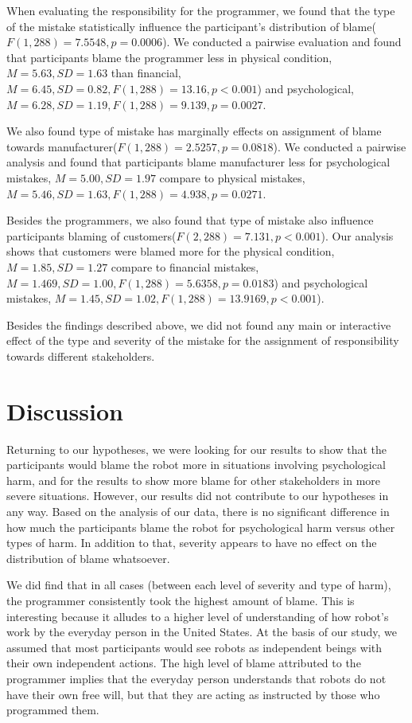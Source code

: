 \documentclass{sigchi}
\begin{document}
When evaluating the responsibility for the programmer, we found that the type of the mistake statistically influence the participant's distribution of blame($F(1,288)=7.5548, p = 0.0006$). We conducted a pairwise evaluation and found that participants blame the programmer less in physical condition, $M=5.63, SD=1.63$ than financial, $M=6.45, SD=0.82, F(1,288)=13.16, p < 0.001$) and psychological, $M=6.28, SD=1.19, F(1,288)=9.139, p = 0.0027$.

We also found type of mistake has marginally effects on assignment of blame towards manufacturer($F(1,288)=2.5257, p = 0.0818$). We conducted a pairwise analysis and found that participants blame manufacturer less for psychological mistakes, $M=5.00, SD=1.97$ compare to physical mistakes, $M=5.46, SD=1.63, F(1,288)=4.938, p=0.0271$.

Besides the programmers, we also found that type of mistake also influence participants blaming of customers($F(2,288)=7.131, p < 0.001$). Our analysis shows that customers were blamed more for the physical condition,$M=1.85, SD=1.27$ compare to financial mistakes,$M=1.469, SD=1.00, F(1,288)=5.6358, p = 0.0183$) and psychological mistakes, $M=1.45, SD=1.02, F(1,288)=13.9169, p < 0.001$).

Besides the findings described above, we did not found any main or interactive effect of the type and severity of the mistake for the assignment of responsibility towards different stakeholders.

\section{Discussion}
Returning to our hypotheses, we were looking for our results to show that the participants would blame the robot more in situations involving psychological harm, and for the results to show more blame for other stakeholders in more severe situations. However, our results did not contribute to our hypotheses in any way. Based on the analysis of our data, there is no significant difference in how much the participants blame the robot for psychological harm versus other types of harm. In addition to that, severity appears to have no effect on the distribution of blame whatsoever.

We did find that in all cases (between each level of severity and type of harm), the programmer consistently took the highest amount of blame. This is interesting because it alludes to a higher level of understanding of how robot's work by the everyday person in the United States. At the basis of our study, we assumed that most participants would see robots as independent beings with their own independent actions. The high level of blame attributed to the programmer implies that the everyday person understands that robots do not have their own free will, but that they are acting as instructed by those who programmed them.
\end{document}
